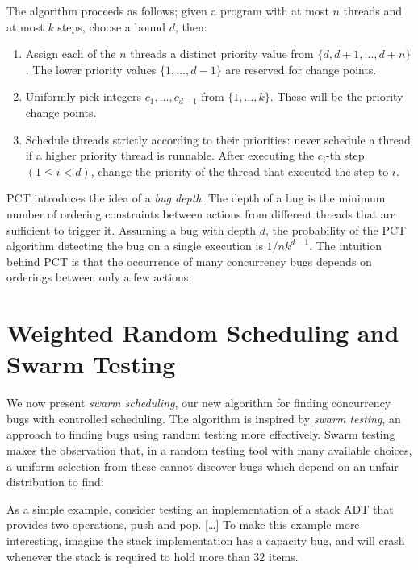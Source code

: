 The algorithm proceeds as follows; given a program with at most $n$
threads and at most $k$ steps, choose a bound $d$, then:

\begin{enumerate}
\item Assign each of the $n$ threads a distinct priority value from
  $\{d, d + 1, \ldots, d+n\}$.  The lower priority values
  $\{1, \ldots, d−1\}$ are reserved for change points.
\item Uniformly pick integers $c_1, \ldots, c_{d−1}$ from $\{1, \ldots, k\}$.
  These will be the priority change points.
\item Schedule threads strictly according to their priorities: never schedule a
  thread if a higher priority thread is runnable.  After executing the $c_i$-th
  step $(1 \leq i < d)$, change the priority of the thread that executed the
  step to $i$.
\end{enumerate}

PCT introduces the idea of a \emph{bug depth}.  The depth of a bug is
the minimum number of ordering constraints between actions from
different threads that are sufficient to trigger
it\cite{burckhardt2010}.  Assuming a bug with depth $d$, the
probability of the PCT algorithm detecting the bug on a single
execution is $1/nk^{d−1}$.  The intuition behind PCT is that the
occurrence of many concurrency bugs depends on orderings between only
a few actions.

\section{Weighted Random Scheduling and Swarm Testing}
\label{sec:algorithms-swarm}

We now present \emph{swarm scheduling}, our new algorithm for finding
concurrency bugs with controlled scheduling.  The algorithm is
inspired by \emph{swarm testing}\cite{groce2012}, an approach to
finding bugs using random testing more effectively.  Swarm testing
makes the observation that, in a random testing tool with many
available choices, a uniform selection from these cannot discover bugs
which depend on an unfair distribution to find:

\begin{displayquote}
  As a simple example, consider testing an implementation of a stack ADT that
  provides two operations, push and pop. [\ldots] To make this example more
  interesting, imagine the stack implementation has a capacity bug, and will
  crash whenever the stack is required to hold more than 32
  items.\cite{groce2012}
\end{displayquote}

